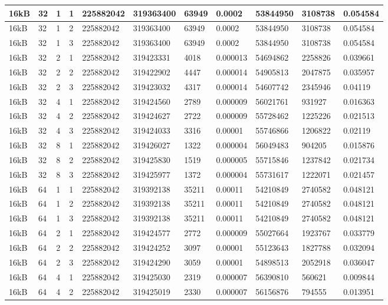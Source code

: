 \documentclass[conference]{IEEEtran}
\begin{document}
\begin{table}
\begin{tabular}{|m{.75cm} |m{.75cm} |m{.8cm} | m{.75cm} | l | l | l | l | l | l | l |}
          										
16kB&	32&	1&	1&	225882042&	319363400&	63949 &0.0002	 & 53844950	  &3108738	&0.054584 \\ \hline
16kB&	32&	1&	2&	225882042&	319363400&	63949 &0.0002	 & 53844950	  &3108738	&0.054584 \\ \hline
16kB&	32&	1&	3&	225882042&	319363400&	63949 &0.0002	 & 53844950	  &3108738	&0.054584 \\ \hline
16kB&	32&	2&	1&	225882042&	319423331&	4018  &0.000013&	54694862	&2258826	&0.039661 \\ \hline
16kB&	32&	2&	2&	225882042&	319422902&	4447  &0.000014&	54905813	&2047875	&0.035957 \\ \hline
16kB&	32&	2&	3&	225882042&	319423032&	4317  &0.000014&	54607742	&2345946	&0.04119  \\ \hline
16kB&	32&	4&	1&	225882042&	319424560&	2789  &0.000009&	56021761	&931927	  &0.016363 \\ \hline
16kB&	32&	4&	2&	225882042&	319424627&	2722  &0.000009&	55728462	&1225226	&0.021513 \\ \hline
16kB&	32&	4&	3&	225882042&	319424033&	3316  &0.00001	&  55746866 &	1206822	&0.02119  \\ \hline
16kB&	32&	8&	1&	225882042&	319426027&	1322  &0.000004&	56049483	&904205	  &0.015876 \\ \hline
16kB&	32&	8&	2&	225882042&	319425830&	1519  &0.000005&	55715846	&1237842	&0.021734 \\ \hline
16kB&	32&	8&	3&	225882042&	319425977&	1372  &0.000004&	55731617	&1222071	&0.021457 \\ \hline
16kB&	64&	1&	1&	225882042&	319392138&	35211 &0.00011	&  54210849 &	2740582	&0.048121 \\ \hline
16kB&	64&	1&	2&	225882042&	319392138&	35211 &0.00011	&  54210849 &	2740582	&0.048121 \\ \hline
16kB&	64&	1&	3&	225882042&	319392138&	35211 &0.00011	&  54210849 &	2740582	&0.048121 \\ \hline
16kB&	64&	2&	1&	225882042&	319424577&	2772  &0.000009&	55027664	&1923767	&0.033779 \\ \hline
16kB&	64&	2&	2&	225882042&	319424252&	3097  &0.00001	&  55123643 &	1827788	&0.032094 \\ \hline
16kB&	64&	2&	3&	225882042&	319424290&	3059  &0.00001	&  54898513 &	2052918	&0.036047 \\ \hline
16kB&	64&	4&	1&	225882042&	319425030&	2319  &0.000007&	56390810	&560621	  &0.009844 \\ \hline
16kB&	64&	4&	2&	225882042&	319425019&	2330  &0.000007&	56156876	&794555	  &0.013951 \\ \hline

\end{tabular}
\end{table}
\end{document}
